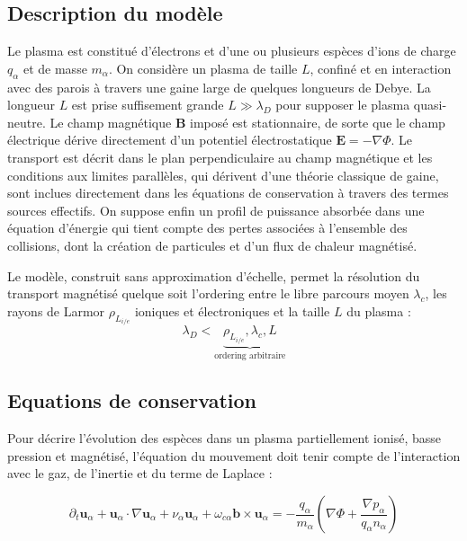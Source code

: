 \begin{refsection}
\section{Description du modèle}
Le plasma est constitué d'électrons et d'une ou plusieurs espèces d'ions de
charge $q_\alpha$ et de masse $m_\alpha$. On considère un plasma de taille $L$,
confiné et en interaction avec des parois à travers une gaine large de quelques longueurs
de Debye. La longueur $L$ est prise suffisement grande $L\gg\lambda_D$ pour
supposer le plasma quasi-neutre. Le champ magnétique $\mathbf{B}$ imposé est 
stationnaire, de sorte que le champ électrique dérive directement d'un 
potentiel électrostatique $\mathbf{E}=-\nabla \Phi$. Le transport est décrit
dans le plan perpendiculaire au champ magnétique et les conditions aux limites
parallèles, qui dérivent d'une théorie classique de gaine, sont
inclues directement dans les équations de conservation à travers des termes
sources effectifs. On suppose enfin un profil de puissance absorbée dans une
équation d'énergie qui tient compte des pertes associées à l'ensemble des
collisions, dont la création de particules et d'un flux de chaleur magnétisé.

Le modèle, construit sans approximation d'échelle, permet la résolution du
transport magnétisé quelque soit l'ordering entre le libre parcours moyen
$\lambda_c$, les rayons de Larmor $\rho_{L_{i/e}}$ ioniques et électroniques et
la taille $L$ du plasma :
\begin{equation*}
\lambda_D<\underbrace{\rho_{L_{i/e}},\lambda_c,L}_\text{ordering arbitraire}
\end{equation*}

\subsection{Equations de conservation}
Pour décrire l'évolution des espèces dans un plasma partiellement ionisé, basse
pression et magnétisé, l'équation du mouvement doit tenir compte de
l'interaction avec le gaz, de l'inertie et du terme de Laplace :

\begin{equation}
\label{3-eqMouvement}
\partial_t \mathbf{u}_\alpha + \mathbf{u}_\alpha\cdot\nabla\mathbf{u}_\alpha+
\nu_\alpha\mathbf{u}_\alpha+\omega_{c\alpha}\mathbf{b}\times\mathbf{u}_\alpha=
-\frac{q_\alpha}{m_\alpha}\left(\nabla \Phi+\frac{\nabla
p_\alpha}{q_\alpha n_\alpha}\right)
\end{equation}


\end{refsection}
